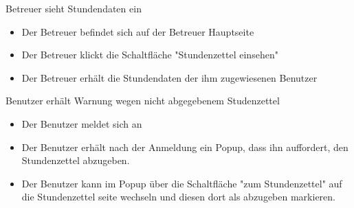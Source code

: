 \begin{requirements}
     Betreuer sieht Stundendaten ein
        \begin{itemize}
                \item Der Betreuer befindet sich auf der Betreuer Hauptseite
                \item Der Betreuer klickt die Schaltfläche "Stundenzettel einsehen"
                \item Der Betreuer erhält die Stundendaten der ihm zugewiesenen Benutzer
            \end {itemize}

     Benutzer erhält Warnung wegen nicht abgegebenem Studenzettel
            \begin{itemize}
                    \item Der Benutzer meldet sich an
                    \item Der Benutzer erhält nach der Anmeldung ein Popup, dass ihn auffordert, den Stundenzettel abzugeben.
                    \item Der Benutzer kann im Popup über die Schaltfläche "zum Stundenzettel" auf die Stundenzettel seite wechseln und diesen dort als abzugeben markieren.
                \end {itemize}

\end{requirements}
